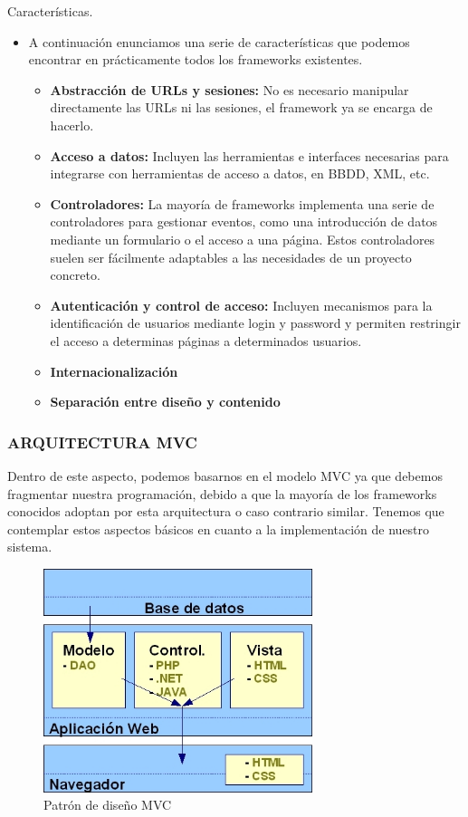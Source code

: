 Características.

\begin{itemize}
  \item A continuación enunciamos una serie de características que podemos encontrar en prácticamente todos los frameworks existentes.
  \begin{itemize}
    \item \textbf{Abstracción de URLs y sesiones: }No es necesario manipular directamente las URLs ni las sesiones, el framework ya se encarga de hacerlo.
    \item \textbf{Acceso a datos: }Incluyen las herramientas e interfaces necesarias para integrarse con herramientas de acceso a datos, en BBDD, XML, etc.
    \item \textbf{Controladores: }La mayoría de frameworks implementa una serie de controladores para gestionar eventos, como una introducción de datos mediante un formulario o el acceso a una página. Estos controladores suelen ser fácilmente adaptables a las necesidades de un proyecto concreto.
    \item \textbf{Autenticación y control de acceso: }Incluyen mecanismos para la identificación de usuarios mediante login y password y permiten restringir el acceso a determinas páginas a determinados usuarios.
    \item \textbf{Internacionalización}
    \item \textbf{Separación entre diseño y contenido}
  \end{itemize}

\end{itemize}

\subsubsection{ARQUITECTURA MVC}

Dentro de este aspecto, podemos basarnos en el modelo MVC ya que debemos fragmentar nuestra programación, debido a que la mayoría de los frameworks conocidos adoptan por esta arquitectura o caso contrario similar. Tenemos que contemplar estos aspectos básicos en cuanto a la implementación de nuestro sistema.\\
\begin{figure}[ht]
\centering
\includegraphics[width=0.7\textwidth]{imagenes/mvc.jpg}%
\caption{Patrón de diseño MVC}
\label{contexto:figura}
\end{figure}

